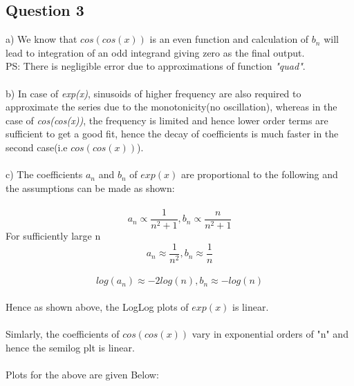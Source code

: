 \documentclass[11pt, a4paper]{article}
\begin{document}
	  \subsection{Question 3}
	  a) We know that $cos(cos(x))$ is an even function and calculation of $b_n$ will lead to integration of an odd integrand giving zero as the final output.\\
	  PS: There is negligible error due to approximations of function \textit{"quad"}.\\
	  \\b) In case of \textit{exp(x)}, sinusoids of higher frequency are also required to approximate the series due to the monotonicity(no oscillation), whereas in the case of \textit{cos(cos(x))}, the frequency is limited and hence lower order terms are sufficient to get a good fit, hence the decay of coefficients is much faster in the second case(i.e $cos(cos(x))$).\\
	  \\c) The coefficients $a_n$ and $b_n$ of $exp(x)$ are proportional to the following and the assumptions can be made as shown:\\
          \\  \begin{equation}
                 a_n \propto \frac{1}{n^2 + 1} , b_n \propto \frac{n}{n^2 + 1}
            \end{equation}
            For sufficiently large n
            \begin{equation}
                 a_n \approx \frac{1}{n^2},  b_n \approx \frac{1}{n}
            \end{equation}		
	    \\
	    \begin{equation}
                 log(a_n) \approx -2log(n),  b_n \approx -log(n)
            \end{equation}		
	 \\
	 Hence as shown above, the LogLog plots of $exp(x)$ is linear.\\
	    \\Simlarly, the coefficients of $cos(cos(x))$ vary in exponential orders of "n" and hence the semilog plt is linear.
        \\
        \\
             Plots for the above are given Below:
\end{document}
